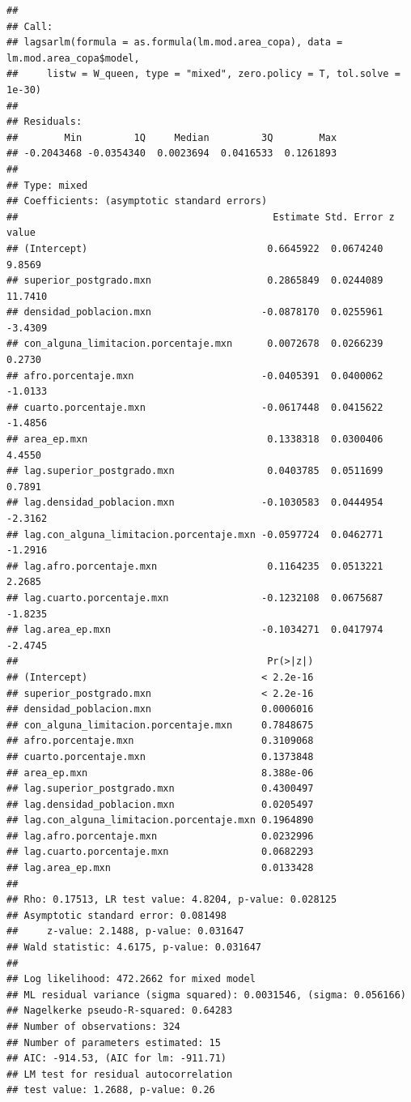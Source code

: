 \documentclass[12pt,]{book}
\begin{document}
\begin{verbatim}
## 
## Call:
## lagsarlm(formula = as.formula(lm.mod.area_copa), data = lm.mod.area_copa$model, 
##     listw = W_queen, type = "mixed", zero.policy = T, tol.solve = 1e-30)
## 
## Residuals:
##        Min         1Q     Median         3Q        Max 
## -0.2043468 -0.0354340  0.0023694  0.0416533  0.1261893 
## 
## Type: mixed 
## Coefficients: (asymptotic standard errors) 
##                                            Estimate Std. Error z value
## (Intercept)                               0.6645922  0.0674240  9.8569
## superior_postgrado.mxn                    0.2865849  0.0244089 11.7410
## densidad_poblacion.mxn                   -0.0878170  0.0255961 -3.4309
## con_alguna_limitacion.porcentaje.mxn      0.0072678  0.0266239  0.2730
## afro.porcentaje.mxn                      -0.0405391  0.0400062 -1.0133
## cuarto.porcentaje.mxn                    -0.0617448  0.0415622 -1.4856
## area_ep.mxn                               0.1338318  0.0300406  4.4550
## lag.superior_postgrado.mxn                0.0403785  0.0511699  0.7891
## lag.densidad_poblacion.mxn               -0.1030583  0.0444954 -2.3162
## lag.con_alguna_limitacion.porcentaje.mxn -0.0597724  0.0462771 -1.2916
## lag.afro.porcentaje.mxn                   0.1164235  0.0513221  2.2685
## lag.cuarto.porcentaje.mxn                -0.1232108  0.0675687 -1.8235
## lag.area_ep.mxn                          -0.1034271  0.0417974 -2.4745
##                                           Pr(>|z|)
## (Intercept)                              < 2.2e-16
## superior_postgrado.mxn                   < 2.2e-16
## densidad_poblacion.mxn                   0.0006016
## con_alguna_limitacion.porcentaje.mxn     0.7848675
## afro.porcentaje.mxn                      0.3109068
## cuarto.porcentaje.mxn                    0.1373848
## area_ep.mxn                              8.388e-06
## lag.superior_postgrado.mxn               0.4300497
## lag.densidad_poblacion.mxn               0.0205497
## lag.con_alguna_limitacion.porcentaje.mxn 0.1964890
## lag.afro.porcentaje.mxn                  0.0232996
## lag.cuarto.porcentaje.mxn                0.0682293
## lag.area_ep.mxn                          0.0133428
## 
## Rho: 0.17513, LR test value: 4.8204, p-value: 0.028125
## Asymptotic standard error: 0.081498
##     z-value: 2.1488, p-value: 0.031647
## Wald statistic: 4.6175, p-value: 0.031647
## 
## Log likelihood: 472.2662 for mixed model
## ML residual variance (sigma squared): 0.0031546, (sigma: 0.056166)
## Nagelkerke pseudo-R-squared: 0.64283 
## Number of observations: 324 
## Number of parameters estimated: 15 
## AIC: -914.53, (AIC for lm: -911.71)
## LM test for residual autocorrelation
## test value: 1.2688, p-value: 0.26
\end{verbatim}
\end{document}
